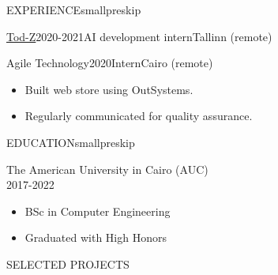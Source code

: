 \documentclass{resume}
\begin{document}
\begin{minipage}[t]{0.54\textwidth}
\begin{rsection}{\MakeUppercase{experience}}{smallpreskip}
\begin{rcontent}[90pt]{\href{https://www.tod-z.com/}{Tod-Z}}{2020-2021}{AI development intern}{Tallinn (remote)}
		\end{rcontent}
		\divider
		\begin{rcontent}[90pt]{Agile Technology}{2020}{Intern}{Cairo (remote)}
			\begin{itemize}
				\item Built web store using OutSystems.
				\item Regularly communicated for quality assurance.
			\end{itemize}
		\end{rcontent}

	\end{rsection}

\end{minipage}
\hfill
\begin{minipage}[t]{0.45\textwidth}

    \begin{rsection}{\MakeUppercase{education}}{smallpreskip}

    \begin{rcontent}{The American University in Cairo (AUC)\\\hphantom}{2017-2022}{}{}
			\begin{itemize}
				\item BSc in Computer Engineering
				\item Graduated with High Honors
			\end{itemize}
		\end{rcontent}

	\end{rsection}

    \begin{rsection}{\MakeUppercase{selected projects}}{}


\end{rsection}
\end{minipage}
\end{document}
